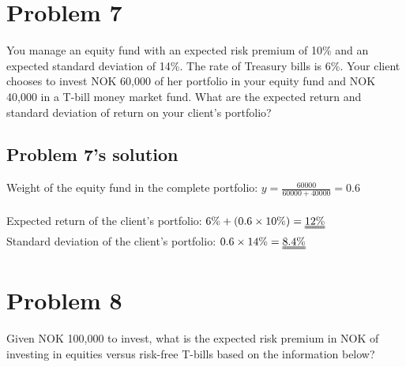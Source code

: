 \documentclass[10]{article}
\begin{document}
\color{black}
\section*{Problem 7}
You manage an equity fund with an expected risk premium of 10\% and an expected standard deviation of 14\%. The rate of Treasury bills is 6\%. Your client chooses to invest NOK 60,000 of her portfolio in your equity fund and NOK 40,000 in a T-bill money market fund. What are the expected return and standard deviation of return on your client's portfolio?

\color{blue}
\subsection*{Problem 7's solution}
Weight of the equity fund in the complete portfolio: $y = \frac{60000}{60000 + 40000} = 0.6$\\
\\
Expected return of the client's portfolio: $6\% + (0.6\times10\%) = \uuline{12\%}$\\
Standard deviation of the client's portfolio: $0.6\times14\% = \uuline{8.4\%}$



\color{black}
\section*{Problem 8}
Given NOK 100,000 to invest, what is the expected risk premium in NOK of investing in equities versus risk-free T-bills based on the information below?


\begin{table}[H]
\label{tab:my-table}
\end{table}
\end{document}
